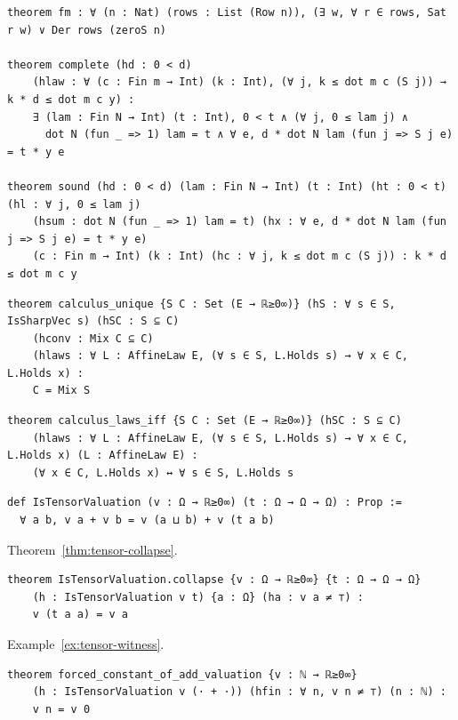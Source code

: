 \begin{lstlisting}
theorem fm : ∀ (n : Nat) (rows : List (Row n)), (∃ w, ∀ r ∈ rows, Sat r w) ∨ Der rows (zeroS n)

theorem complete (hd : 0 < d)
    (hlaw : ∀ (c : Fin m → Int) (k : Int), (∀ j, k ≤ dot m c (S j)) → k * d ≤ dot m c y) :
    ∃ (lam : Fin N → Int) (t : Int), 0 < t ∧ (∀ j, 0 ≤ lam j) ∧
      dot N (fun _ => 1) lam = t ∧ ∀ e, d * dot N lam (fun j => S j e) = t * y e

theorem sound (hd : 0 < d) (lam : Fin N → Int) (t : Int) (ht : 0 < t) (hl : ∀ j, 0 ≤ lam j)
    (hsum : dot N (fun _ => 1) lam = t) (hx : ∀ e, d * dot N lam (fun j => S j e) = t * y e)
    (c : Fin m → Int) (k : Int) (hc : ∀ j, k ≤ dot m c (S j)) : k * d ≤ dot m c y
\end{lstlisting}

\label{lean:calculus-unique}
\begin{lstlisting}
theorem calculus_unique {S C : Set (E → ℝ≥0∞)} (hS : ∀ s ∈ S, IsSharpVec s) (hSC : S ⊆ C)
    (hconv : Mix C ⊆ C)
    (hlaws : ∀ L : AffineLaw E, (∀ s ∈ S, L.Holds s) → ∀ x ∈ C, L.Holds x) :
    C = Mix S
\end{lstlisting}

\label{lean:calculus-laws-iff}
\begin{lstlisting}
theorem calculus_laws_iff {S C : Set (E → ℝ≥0∞)} (hSC : S ⊆ C)
    (hlaws : ∀ L : AffineLaw E, (∀ s ∈ S, L.Holds s) → ∀ x ∈ C, L.Holds x) (L : AffineLaw E) :
    (∀ x ∈ C, L.Holds x) ↔ ∀ s ∈ S, L.Holds s
\end{lstlisting}

\label{lean:tensor-valuation}
\begin{lstlisting}
def IsTensorValuation (v : Ω → ℝ≥0∞) (t : Ω → Ω → Ω) : Prop :=
  ∀ a b, v a + v b = v (a ⊔ b) + v (t a b)
\end{lstlisting}

\noindent Theorem~\ref{thm:tensor-collapse}.

\label{lean:tensor-collapse}
\begin{lstlisting}
theorem IsTensorValuation.collapse {v : Ω → ℝ≥0∞} {t : Ω → Ω → Ω}
    (h : IsTensorValuation v t) {a : Ω} (ha : v a ≠ ⊤) :
    v (t a a) = v a
\end{lstlisting}

\noindent Example~\ref{ex:tensor-witness}.

\label{lean:tensor-witness}
\begin{lstlisting}
theorem forced_constant_of_add_valuation {v : ℕ → ℝ≥0∞}
    (h : IsTensorValuation v (· + ·)) (hfin : ∀ n, v n ≠ ⊤) (n : ℕ) :
    v n = v 0
\end{lstlisting}

